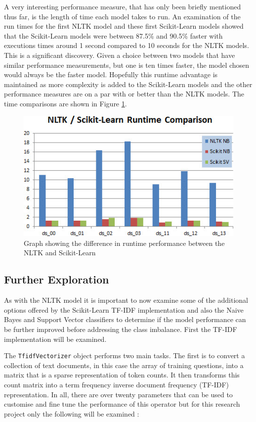 A very interesting performance measure, that has only been briefly mentioned thus far, is the length of time each model takes to run. An examination of the run times for the first NLTK model and these first Scikit-Learn models showed that the Scikit-Learn models were between 87.5\% and 90.5\% faster with executions times around 1 second compared to 10 seconds for the NLTK models. This is a significant discovery. Given a choice between two models that have similar performance measurements, but one is ten times faster, the model chosen would always be the faster model. Hopefully this runtime advantage is maintained as more complexity is added to the Scikit-Learn models and the other performance measures are on a par with or better than the NLTK models. The time comparisons are shown in Figure \ref{fig:runtime_comp}.

\begin{figure}[htbp]
	\centering
	\includegraphics[width=.75\textwidth]{Figures/Chapter5/runtime_comp.jpg}
	\caption[NLTK - Scikit-Learn runtime comparison]{Graph showing the difference in runtime performance between the NLTK and Scikit-Learn}
	\label{fig:runtime_comp}
\end{figure}

\subsection{Further Exploration}
As with the NLTK model it is important to now examine some of the additional options offered by the Scikit-Learn TF-IDF implementation and also the Naive Bayes and Support Vector classifiers to determine if the model performance can be further improved before addressing the class imbalance. First the TF-IDF implementation will be examined.

The \verb|TfidfVectorizer| object performs two main tasks. The first is to convert a collection of text documents, in this case the array of training questions, into a matrix that is a sparse representation of token counts. It then transforms this count matrix into a term frequency inverse document frequency (TF-IDF) representation. In all, there are over twenty parameters that can be used to customise and fine tune the performance of this operator but for this research project only the following will be examined \cite{scikit-learn}:

